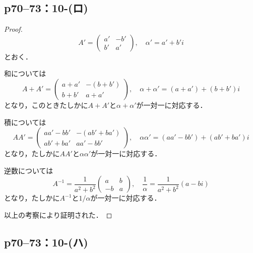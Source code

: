 \documentclass[a4paper,10pt,fleqn]{ltjsarticle}
\begin{document}
\newpage


\subsection*{p70--73：10-(ロ)}

\begin{tleftbar}
  \begin{proof}
    \[
      A' = \begin{pmatrix} a' & -b' \\ b' & a' \end{pmatrix} , \quad \alpha ' = a' + b' i
    \]
    とおく．

    和については
    \[
      A+A' = \begin{pmatrix} a+a' & -(b+b') \\ b+b' & a+a' \end{pmatrix} , \quad \alpha + \alpha ' = (a+a') + (b+b') i
    \]
    となり，このときたしかに$A+A'$と$\alpha + \alpha '$が一対一に対応する．

    積については
    \[
      A A' = \begin{pmatrix} a a' - b b' & - (a b' + b a') \\ a b' + b a' & a a' - b b' \end{pmatrix} , \quad \alpha \alpha ' = (a a' - b b') + (a b' + b a') i
    \]
    となり，たしかに$AA'$と$\alpha \alpha '$が一対一に対応する．

    逆数については
    \[
      A^{-1} = \frac{1}{a^2+b^2} \begin{pmatrix} a & b \\ -b & a \end{pmatrix},\quad \frac{1}{\alpha} = \frac{1}{a^2+b^2}(a -bi )
    \]
    となり，たしかに$A^{-1}$と$1/\alpha$が一対一に対応する．

    以上の考察により証明された．
  \end{proof}
\end{tleftbar}


\newpage

\subsection*{p70--73：10-(ハ)}
\end{document}
